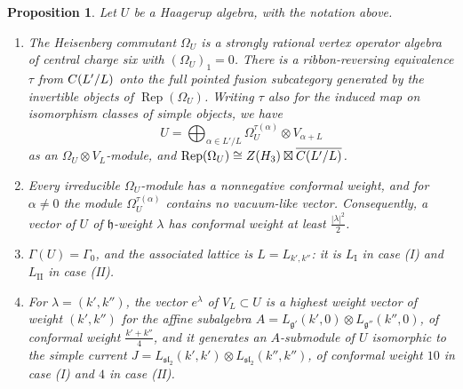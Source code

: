\documentclass[leqno]{article}
\let\cal\relax
\newcommand{\cal}{\mathcal}
\newcommand{\ot}{\otimes}
\DeclareMathOperator{\Rep}{Rep}
\newtheorem{prop}[thm]{Proposition}
\numberwithin{equation}{section}
\begin{document}
\begin{prop}
\label{prop:associated-lattice}
Let $U$ be a Haagerup algebra, with the notation above.
\begin{enumerate}
\item The Heisenberg commutant $\Omega_U$ is a strongly rational vertex operator algebra of central charge six with $(\Omega_U)_1 = 0$. There is a ribbon-reversing equivalence $\tau$ from $\cal C(L'/L)$ onto the full pointed fusion subcategory generated by the invertible objects of $\Rep(\Omega_U)$. Writing $\tau$ also for the induced map on isomorphism classes of simple objects, we have
\[
U = \bigoplus_{\alpha \in L'/L} \Omega_U^{\tau(\alpha)} \ot V_{\alpha+L}
\]
as an $\Omega_U \ot V_L$-module, and $\Rep(\Omega_U) \cong Z(\cal H_3) \boxtimes \overline{\cal C(L'/L)}$.
\item Every irreducible $\Omega_U$-module has a nonnegative conformal weight, and for $\alpha \neq 0$ the module $\Omega_U^{\tau(\alpha)}$ contains no vacuum-like vector. Consequently, a vector of $U$ of $\mathfrak h$-weight $\lambda$ has conformal weight at least $\frac{|\lambda|^2}2$.
\item $\Gamma(U) = \Gamma_0$, and the associated lattice is $L = L_{k',k''}$: it is $L_{\mathrm I}$ in case (I) and $L_{\mathrm{II}}$ in case (II).
\item For $\lambda = (k',k'')$, the vector $e^\lambda$ of $V_L \subset U$ is a highest weight vector of weight $(k',k'')$ for the affine subalgebra $A = L_{\mathfrak g'}(k',0) \ot L_{\mathfrak g''}(k'',0)$, of conformal weight $\frac{k'+k''}4$, and it generates an $A$-submodule of $U$ isomorphic to the simple current $J = L_{\mathfrak{sl}_2}(k',k') \ot L_{\mathfrak{sl}_2}(k'',k'')$, of conformal weight $10$ in case (I) and $4$ in case (II).
\end{enumerate}
\end{prop}
\end{document}
